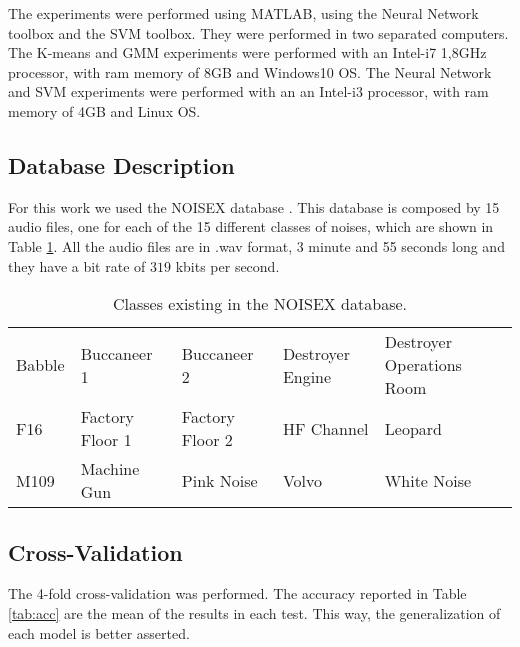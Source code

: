 \documentclass[12pt]{article}
\begin{document}

The experiments were performed using MATLAB, using the Neural Network toolbox and the SVM toolbox. They were performed in two separated computers. The K-means and GMM experiments were performed with an Intel-i7 1,8GHz processor, with ram memory of 8GB and Windows10 OS. The Neural Network and SVM experiments were performed with an an Intel-i3 processor, with ram memory of 4GB and Linux OS.

\subsection{Database Description} \label{exp:data}


For this work we used the NOISEX database \cite{varga1993assessment}. This database is composed by 15 audio files, one for each of the 15 different classes of noises, which are shown in Table \ref{tab:noisex}. All the audio files are in .wav format, 3 minute and 55 seconds long and they have a bit rate of $319$ kbits per second.

\begin{table}[ht]
	\centering
	\caption{Classes existing in the NOISEX database.}
	\label{tab:noisex}
	\begin{tabular}{lllll}
		\hline
		Babble & Buccaneer 1 & Buccaneer 2 & Destroyer Engine& Destroyer Operations Room\\
		F16 & Factory Floor 1 & Factory Floor 2 & HF Channel & Leopard\\
		M109 & Machine Gun & Pink Noise & Volvo & White Noise\\
		\hline
	\end{tabular}
\end{table}

\subsection{Cross-Validation} \label{exp:crossv}

The 4-fold cross-validation was performed. The accuracy reported in Table \ref{tab:acc} are the mean of the results in each test. This way, the generalization of each model is better asserted.
\end{document}
